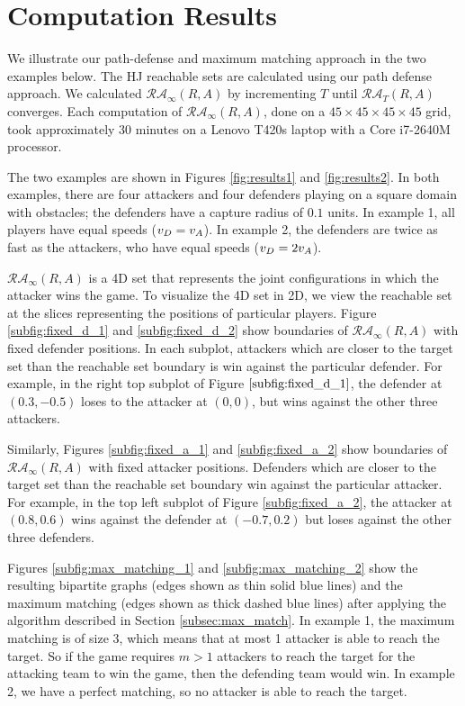 \section{Computation Results}
\label{sec:results}

We illustrate our path-defense and maximum matching approach in the two examples below. The HJ reachable sets are calculated using our path defense approach. We calculated $\mathcal{RA}_\infty(R,A)$ by incrementing $T$ until $\mathcal{RA}_T(R,A)$ converges. Each computation of $\mathcal{RA}_\infty(R,A)$, done on a $45\times45\times45\times45$ grid, took approximately 30 minutes on a Lenovo T420s laptop with a Core i7-2640M processor. 

The two examples are shown in Figures \ref{fig:results1} and \ref{fig:results2}. In both examples, there are four attackers and four defenders playing on a square domain with obstacles; the defenders have a capture radius of $0.1$ units. In example 1, all players have equal speeds ($v_D=v_A$). In example 2, the defenders are twice as fast as the attackers, who have equal speeds ($v_D=2v_A$).

$\mathcal{RA}_\infty(R,A)$ is a 4D set that represents the joint configurations in which the attacker wins the game. To visualize the 4D set in 2D, we view the reachable set at the slices representing the positions of particular players. Figure \ref{subfig:fixed_d_1} and \ref{subfig:fixed_d_2} show boundaries of $\mathcal{RA}_\infty(R,A)$ with fixed defender positions. In each subplot, attackers which are closer to the target set than the reachable set boundary is win against the particular defender. For example, in the right top subplot of Figure $\ref{subfig:fixed_d_1}$, the defender at $(0.3,-0.5)$ loses to the attacker at $(0,0)$, but wins against the other three attackers. 

Similarly, Figures \ref{subfig:fixed_a_1} and \ref{subfig:fixed_a_2} show boundaries of $\mathcal{RA}_\infty(R,A)$ with fixed attacker positions. Defenders which are closer to the target set than the reachable set boundary win against the particular attacker. For example, in the top left subplot of Figure \ref{subfig:fixed_a_2}, the attacker at $(0.8, 0.6)$ wins against the defender at $(-0.7, 0.2)$ but loses against the other three defenders.

Figures \ref{subfig:max_matching_1} and \ref{subfig:max_matching_2} show the resulting bipartite graphs (edges shown as thin solid blue lines) and the maximum matching (edges shown as thick dashed blue lines) after applying the algorithm described in Section \ref{subsec:max_match}. In example 1, the maximum matching is of size 3, which means that at most 1 attacker is able to reach the target. So if the game requires $m>1$ attackers to reach the target for the attacking team to win the game, then the defending team would win. In example 2, we have a perfect matching, so no attacker is able to reach the target.

